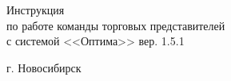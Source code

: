 

	
\begin{flushright}
\end{flushright}

\vspace{\baselineskip}
\vspace{\baselineskip}
\vspace{\baselineskip}
\vspace{\baselineskip}

\begin{center}
Инструкция\\
по работе команды торговых представителей\\
с системой <<Оптима>> \tiny{вер. 1.5.1} 
\end{center}


\begin{multicols}{2}
\flushleft г. Новосибирск
\flushright {} 
\end{multicols}

\toccontents

%
%
%
\cleardoublepage
{}
\begingroup
\renewcommand\numberline[1]{}
\emptypage\listoffigures\thispagestyle{empty} \newpage
\endgroup


%
%
%
%
%	
%	
%	



